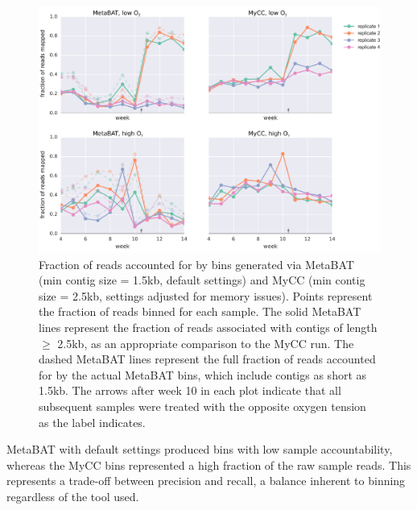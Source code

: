 \begin{figure}[H]
\centering
    \includegraphics[width=1.0\textwidth]{./tex/chapter2/figures/170201_comparable_read_coverage_for_metabat_and_mycc_3kb--INKSCAPED.pdf}
    \begin{singlespace}
    \caption[Fraction of reads accounted for by MetaBAT and MyCC bins]{
        Fraction of reads accounted for by bins generated via MetaBAT (min contig size = 1.5kb, default settings) and MyCC (min contig size = 2.5kb, settings adjusted for memory issues).
        Points represent the fraction of reads binned for each sample.
        The solid MetaBAT lines represent the fraction of reads associated with contigs of length $\geq$ 2.5kb, as an appropriate comparison to the MyCC run.
        The dashed MetaBAT lines represent the full fraction of reads accounted for by the actual MetaBAT bins, which include contigs as short as 1.5kb.
        The arrows after week 10 in each plot indicate that all subsequent samples were treated with the opposite oxygen tension as the label indicates.
    }
    \label{fig:binning_frac_reads_mapped}
    \end{singlespace}
\end{figure}

MetaBAT with default settings produced bins with low sample accountability, whereas the MyCC bins represented a high fraction of the raw sample reads.
This represents a trade-off between precision and recall, a balance inherent to binning regardless of the tool used.

